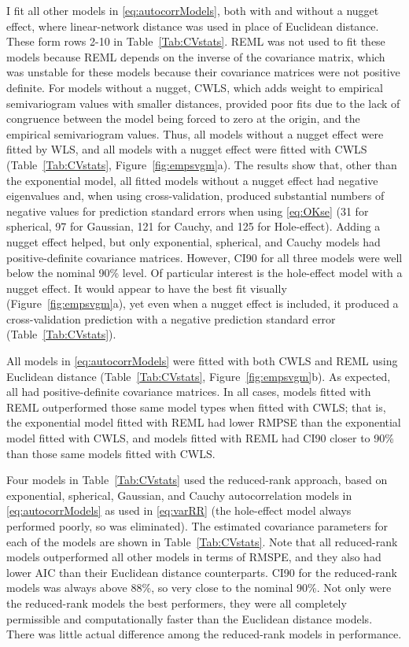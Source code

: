 \documentclass[11pt, titlepage]{article}\usepackage[]{graphicx}\usepackage[]{color}
\begin{document}
\begin{spacing}{1.9}
\begin{flushleft}
I fit all other models in \ref{eq:autocorrModels}, both with and without a nugget effect, where linear-network distance was used in place of Euclidean distance.  These form rows 2-10 in Table~\ref{Tab:CVstats}. REML was not used to fit these models because REML depends on the inverse of the covariance matrix, which was unstable for these models because their covariance matrices were not positive definite. For models without a nugget, CWLS, which adds weight to empirical semivariogram values with smaller distances, provided poor fits due to the lack of congruence between the model being forced to zero at the origin, and the empirical semivariogram values.  Thus, all models without a nugget effect were fitted by WLS, and all models with a nugget effect were fitted with CWLS (Table~\ref{Tab:CVstats}, Figure~\ref{fig:empsvgm}a). The results show that, other than the exponential model, all fitted models without a nugget effect had negative eigenvalues and, when using cross-validation, produced substantial numbers of negative values for prediction standard errors when using \ref{eq:OKse} (31 for spherical, 97 for Gaussian, 121 for Cauchy, and 125 for Hole-effect).  Adding a nugget effect helped, but only exponential, spherical, and Cauchy models had positive-definite covariance matrices.  However, CI90 for all three models were well below the nominal 90\% level.  Of particular interest is the hole-effect model with a nugget effect. It would appear to have the best fit visually (Figure~\ref{fig:empsvgm}a), yet even when a nugget effect is included, it produced a cross-validation prediction with a negative prediction standard error (Table~\ref{Tab:CVstats}).

All models in \ref{eq:autocorrModels} were fitted with both CWLS and REML using Euclidean distance (Table~\ref{Tab:CVstats}, Figure~\ref{fig:empsvgm}b).  As expected, all had positive-definite covariance matrices.  In all cases, models fitted with REML outperformed those same model types when fitted with CWLS; that is, the exponential model fitted with REML had lower RMPSE than the exponential model fitted with CWLS, and models fitted with REML had CI90 closer to 90\% than those same models fitted with CWLS.

Four models in Table~\ref{Tab:CVstats} used the reduced-rank approach, based on exponential, spherical, Gaussian, and Cauchy autocorrelation models in \ref{eq:autocorrModels} as used in \ref{eq:varRR} (the hole-effect model always performed poorly, so was eliminated).  The estimated covariance parameters for each of the models are shown in Table~\ref{Tab:CVstats}.  Note that all reduced-rank models outperformed all other models in terms of RMSPE, and they also had lower AIC than their Euclidean distance counterparts.  CI90 for the reduced-rank models was always above 88\%, so very close to the nominal 90\%. Not only were the reduced-rank models the best performers, they were all completely permissible and computationally faster than the Euclidean distance models.  There was little actual difference among the reduced-rank models in performance.  


\end{flushleft}
\end{spacing}
\end{document}

